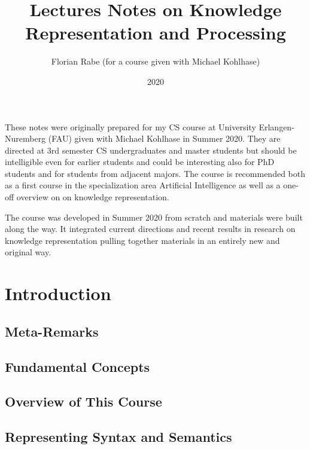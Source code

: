 \documentclass{book}
\title{Lectures Notes on Knowledge Representation and Processing}
\author{Florian Rabe (for a course given with Michael Kohlhase)}
\date{2020}
\begin{document}
\maketitle


\bigskip

These notes were originally prepared for my CS course at University Erlangen-Nuremberg (FAU) given with Michael Kohlhase in Summer 2020.
They are directed at 3rd semester CS undergraduates and master students but should be intelligible even for earlier students and could be interesting also for PhD students and for students from adjacent majors.
The course is recommended both as a first course in the specialization area Artificial Intelligence as well as a one-off overview on on knowledge representation.

The course was developed in Summer 2020 from scratch and materials were built along the way.
It integrated current directions and recent results in research on knowledge representation pulling together materials in an entirely new and original way.

\tableofcontents

\newpage

\part{Introduction}\label{sec:wuv:intro}

\chapter{Meta-Remarks}
  

\chapter{Fundamental Concepts}\label{sec:wuv:concepts}
  

\chapter{Overview of This Course}
  

\chapter{Representing Syntax and Semantics}\label{sec:wuv:syntax}
  
\end{document}
